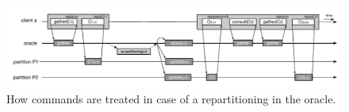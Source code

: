 

\begin{figure}
\begin{minipage}[b]{1\linewidth} %
\centering
      \includegraphics[width=1.0\linewidth]{figures/repartitioning}
\end{minipage}
\caption{How commands are treated in case of a repartitioning in the oracle.}
\label{fig:oracle_repartition}
\end{figure}
